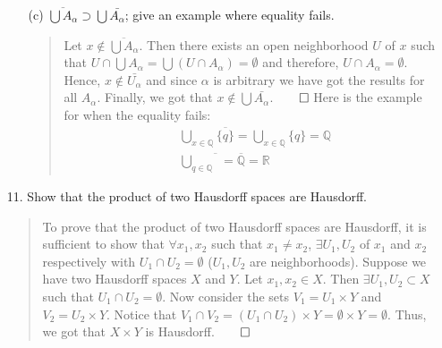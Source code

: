 \documentclass[12pt, a4paper]{article}
\newcommand{\rats}{\mathbb{Q}} %
\newcommand{\reals}{\mathbb{R}} %
\begin{document}
\begin{itemize}
\begin{itemize}
\item[]
\item[]

\item[(c)]
$\overline{\bigcup A_\alpha} \supset \bigcup \bar{A_\alpha}$; give an example where equality fails.
\begin{quote}
Let $x \notin \overline{\bigcup A_\alpha}$. Then there exists an open neighborhood $U$ of $x$
such that $U \cap \bigcup A_\alpha = \bigcup (U \cap A_\alpha) = \emptyset$ and therefore, $U \cap A_\alpha = \emptyset$.
Hence, $x \notin \bar{U_\alpha}$ and since $\alpha$ is arbitrary
we have got the results for all $A_\alpha$. Finally, we got that $x \notin \bigcup \bar{A_\alpha}$.$\qed$
\newline
\newline
Here is the example for when the equality fails:
\begin{align*}
&\bigcup_{x \in \rats} \overline{\{q\}} = \bigcup_{x \in \rats} \{q\} = \rats\\
&\overline{\bigcup_{q \in \rats}} = \overline{\rats} = \reals
\end{align*}
\end{quote}
\end{itemize}

\item[]
\item[]

\item[11.]
Show that the product of two Hausdorff spaces are Hausdorff.
\begin{quote}
To prove that the product of two Hausdorff spaces are Hausdorff,
it is sufficient to show that $\forall x_1, x_2$ such that $x_1 \neq x_2$,
$\exists U_1, U_2$ of $x_1$ and $x_2$ respectively with $U_1 \cap U_2 = \emptyset$ ($U_1, U_2$ are neighborhoods).
Suppose we have two Hausdorff spaces $X$ and $Y$.
Let $x_1, x_2 \in X$. Then $\exists U_1, U_2 \subset X$
such that $U_1 \cap U_2 = \emptyset$. Now consider the sets
$V_1 = U_1 \times Y$ and $V_2 = U_2 \times Y$. Notice that
$V_1 \cap V_2 = (U_1 \cap U_2) \times Y = \emptyset \times Y = \emptyset$.
Thus, we got that $X \times Y$ is Hausdorff.$\qed$
\end{quote}

\item[]
\item[]


\end{itemize}
\end{document}

